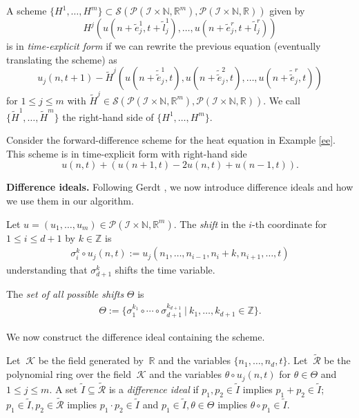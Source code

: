 \documentclass[runningheads]{llncs}
\newcommand{\Rr}{\mathbb{R}}
\newcommand{\Nn}{\mathbb{N}}
\newcommand{\Zz}{{\mathbb{Z}}}
\newcommand{\1}{\chi}
\newcommand{\Ii}{\mathcal{I}}
\begin{document}
\begin{definition}
	A scheme $\{H^1,\ldots,H^m\}\subset\mathcal{S}(\mathcal{P}(\Ii\times\Nn,\Rr^m),\mathcal{P}(\Ii\times\Nn,\Rr))$ given by
	\begin{equation*}
		H^j(u(n+\tilde{e}_j^1,t+\tilde{l}_j^1),\ldots,u(n+\tilde{e}_j^r,t+\tilde{l}_j^r))
	\end{equation*}
	is in \emph{time-explicit form} if we can rewrite the previous equation (eventually translating the scheme) as
	\begin{equation*}
		u_j(n,t+1)-\tilde{H}^j(u(n+\tilde{\tilde{e}}_j^1,t),u(n+\tilde{\tilde{e}}_j^2,t),\ldots,u(n+\tilde{\tilde{e}}_j^r,t))
	\end{equation*}
	for $1\leq j\leq m$
	with $\tilde{H}^j\in\mathcal{S}(\mathcal{P}(\Ii\times\Nn,\Rr^m),\mathcal{P}(\Ii\times\Nn,\Rr))$. We call $\{\tilde{H}^1,\ldots,\tilde{H}^m\}$ the right-hand side of $\{H^1,\ldots,H^m\}$.
\end{definition}
\begin{example}\label{timeexplicitheateq}
	Consider the forward-difference scheme for the heat equation in Example \ref{ee}. 
	This scheme is in time-explicit form with right-hand side
	\begin{equation*}
		u(n,t)+(u(n+1,t)-2u(n,t)+u(n-1,t)).
	\end{equation*}
\end{example}
{\bf Difference ideals.}\label{diffid}
Following Gerdt \cite{gerdt12}, we now introduce difference ideals and how we use them in our algorithm.
\begin{definition}
	Let $u=(u_1,\dots,u_m)\in\mathcal{P}(\Ii\times\Nn,\Rr^m)$. The \emph{shift} in the $i$-th coordinate for $1\leq i\leq d+1$ by $k\in\Zz$ is
	\begin{gather*}
		\sigma_i^k\circ u_j(n,t):=u_j(n_1,\ldots,n_{i-1},n_i+k,n_{i+1},\ldots,t)
	\end{gather*}
	understanding that $\sigma_{d+1}^k$ shifts the time variable.
\end{definition}
\begin{definition}
	The \emph{set of all possible shifts} $\Theta$ is
	\begin{gather*}
		\Theta:=\{\sigma_1^{k_1}\circ\cdots\circ\sigma_{d+1}^{k_{d+1}}\ |\ k_1,\ldots,k_{d+1}\in\Zz\}.
	\end{gather*}
\end{definition}
We now construct the difference ideal containing the scheme.
\begin{definition}
	\label{diffideal}
	Let $\ \mathcal{K}$ be the field generated by $\ \Rr$ and the variables $\{n_1,\ldots,n_d,t\}$. Let $\ \tilde{\mathcal{R}}$ be the polynomial ring over the field $\ \mathcal{K}$ and the variables $\theta\circ u_j(n,t)$ for $\theta\in\Theta$ and $1\leq j\leq m$.
	A set $\tilde{I}\subseteq\tilde{\mathcal{R}}$ is a \emph{difference ideal} if
	$p_1,p_2\in\tilde{I}$ implies $p_1+p_2\in\tilde{I}$;
	$p_1\in\tilde{I},p_2\in\tilde{\mathcal{R}}$ implies $p_1\cdot p_2\in\tilde{I}$ and
	$p_1\in\tilde{I},\theta\in\Theta$ implies $\theta\circ p_1\in\tilde{I}$.
\end{definition}
\end{document}
